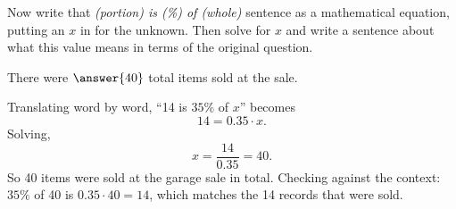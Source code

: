 \documentclass[12pt]{ximera}
\begin{document}
\begin{problem}
Now write that \emph{(portion) is (\%) of (whole)} sentence as a mathematical equation,
putting an $x$ in for the unknown. Then solve for $x$ and write a sentence about what
this value means in terms of the original question.

There were $\answer{40}$ total items sold at the sale.

\begin{freeResponse}
\end{freeResponse}

\begin{solution}
Translating word by word, ``14 is $35\%$ of $x$'' becomes
\[
14 = 0.35 \cdot x.
\]
Solving,
\[
x = \frac{14}{0.35} = 40.
\]
So 40 items were sold at the garage sale in total. Checking against the context: $35\%$
of 40 is $0.35 \cdot 40 = 14$, which matches the 14 records that were sold.
\end{solution}
\end{problem}
\end{document}
